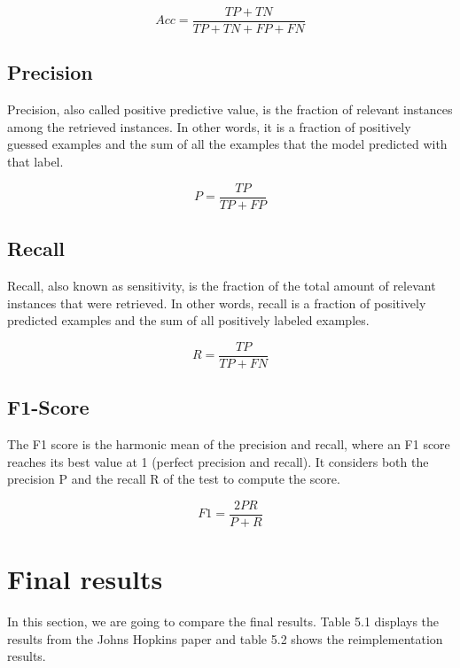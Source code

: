 \documentclass[times, utf8, seminar]{fer}
\begin{document}
\begin{equation}
Acc = \frac{TP + TN}{TP+TN+FP+FN}
\end{equation} 

\subsection{Precision}

Precision, also called positive predictive value, is the fraction of relevant instances among the retrieved instances. In other words, it is a fraction of positively guessed examples and the sum of all the examples that the model predicted with that label.

\begin{equation}
P = \frac{TP }{TP+FP}
\end{equation} 

\subsection{Recall}

Recall, also known as sensitivity, is the fraction of the total amount of relevant instances that were retrieved. In other words, recall is a fraction of positively predicted examples and the sum of all positively labeled examples.

\begin{equation}
R = \frac{TP }{TP+FN}
\end{equation} 

\subsection{F1-Score}

The F1 score is the harmonic mean of the precision and recall, where an F1 score reaches its best value at 1 (perfect precision and recall). It considers both the precision P and the recall R of the test to compute the score.

\begin{equation}
F1 = \frac{2PR }{P+R}
\end{equation} 

\section{Final results}

In this section, we are going to compare the final results. Table 5.1 displays the results from the Johns Hopkins paper and table 5.2 shows the reimplementation results. 
\end{document}
